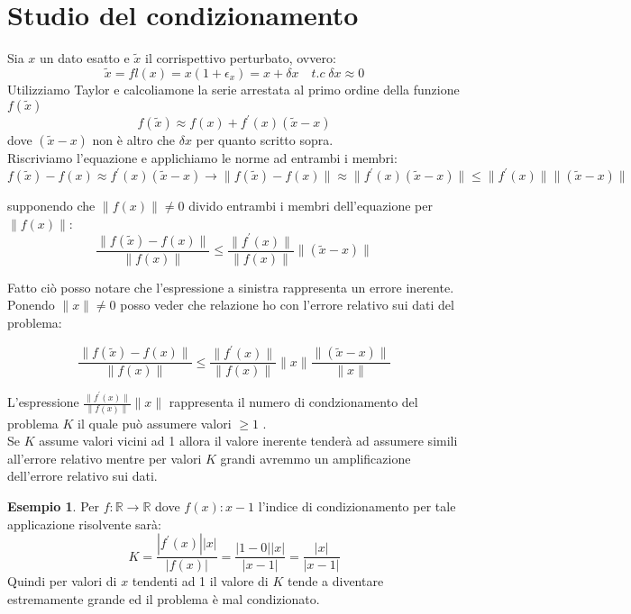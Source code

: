 \documentclass[12pt, a4paper]{book}
\theoremstyle{definition}
\newtheorem{exmp}{Esempio}[section]
\begin{document}
\section{Studio del condizionamento}
\begin{flushleft}
Sia $x$ un dato esatto e $\tilde{x}$ il corrispettivo perturbato, ovvero: 
\[ \tilde{x} = fl(x) = x(1+\epsilon_{x}) = x + \delta x  \quad t.c \; \delta x \approx 0\]
Utilizziamo Taylor e calcoliamone la serie arrestata al primo ordine della funzione $f(\tilde{x})$
\[f(\tilde{x}) \approx f(x) + f^{'}(x)(\tilde{x} - x) \]
dove $(\tilde{x} - x)$ non è altro che $\delta x$ per quanto scritto sopra.\\

Riscriviamo l'equazione e applichiamo le norme ad entrambi i membri: 
\[
		f(\tilde{x}) - f(x)  \approx   f^{'}(x)(\tilde{x} - x) \rightarrow \lVert f(\tilde{x})-f(x)\rVert\approx\lVert f^{'}(x)(\tilde{x} - x)\rVert\leq\lVert f^{'}(x)\rVert \lVert(\tilde{x} - x)\rVert 
\]

supponendo che $\lVert f(x) \rVert \neq 0$ divido entrambi i membri dell'equazione per $\lVert f(x) \rVert$:
\[ 
	\frac{\lVert f(\tilde{x})-f(x)\rVert}{\lVert f(x) \rVert} \leq \frac{\lVert f^{'}(x)\rVert}{\lVert f(x) \rVert } \lVert(\tilde{x} - x)\rVert 
\]

Fatto ciò posso notare che l'espressione a sinistra rappresenta un errore inerente.  Ponendo  $\lVert x \rVert \neq 0$ posso veder che relazione ho con l'errore relativo sui dati del problema:

\[ 
	\frac{\lVert f(\tilde{x})-f(x)\rVert}{\lVert f(x) \rVert} \leq 
	\frac{\lVert f^{'}(x)\rVert}{\lVert f(x)\rVert }\lVert x\rVert \frac{\lVert(\tilde{x} - x)\rVert }{\lVert x\rVert}
\]

L'espressione $\frac{\lVert f^{'}(x)\rVert}{\lVert f(x)\rVert }\lVert x\rVert$ rappresenta il numero di condzionamento del problema $K$ il quale può assumere valori $\geq 1$ .  \\
Se $K$ assume valori vicini ad 1 allora il valore inerente tenderà ad assumere simili all'errore relativo mentre per valori $K$ grandi avremmo un amplificazione dell'errore relativo sui dati.

\begin{exmp}
Per $f: \mathbb{R} \rightarrow \mathbb{R}$ dove $f(x): x-1$ l'indice di condizionamento per tale applicazione risolvente sarà: 
\[ K = \frac{|f^{'}(x)| |x|}{|f(x)|} = \frac{|1-0||x|}{|x-1|} = \frac{|x|}{|x-1|} \]
Quindi per valori di $x$ tendenti ad 1 il valore di $K$ tende a diventare estremamente grande ed il problema è mal condizionato.
\end{exmp}



\end{flushleft}
\end{document}
